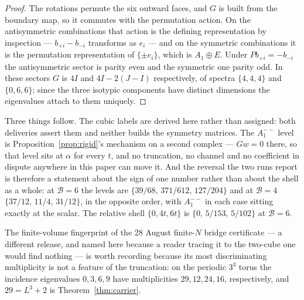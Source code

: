 \documentclass[11pt]{article}
\theoremstyle{plain}
\theoremstyle{definition}
\theoremstyle{remark}
\newcommand{\chk}[1]{}
\begin{document}
\begin{proof}
The rotations permute the six outward faces, and $G$ is built from the boundary
map, so it commutes with the permutation action. On the antisymmetric
combinations that action is the defining representation by inspection --- $b_{+i}-b_{-i}$
transforms as $e_i$ --- and on the symmetric combinations it is the
permutation representation of $\{\pm e_i\}$, which is $A_1\oplus E$. Under
$Pb_{+i}=-b_{-i}$ the antisymmetric sector is parity even and the symmetric one
parity odd. In these sectors $G$ is $4I$ and $4I-2(J-I)$ respectively, of
spectra $\{4,4,4\}$ and $\{0,6,6\}$; since the three isotypic components have
distinct dimensions the eigenvalues attach to them uniquely.
\end{proof}
\chk{the one-cube shell is A1 + T1 + E, and its flat level is the S\^{}2 fundamental class}

Three things follow. The cubic labels are derived here rather than assigned:
both deliveries assert them and neither builds the symmetry matrices. The
$A_1^{--}$ level is Proposition~\ref{prop:rigid}'s mechanism on a second
complex --- $Gw=0$ there, so that level sits at $\alpha$ for every $t$, and no truncation, no
channel and no coefficient in dispute anywhere in this paper can move it. And
the reversal the two runs report is therefore a statement about the sign of one
number rather than about the shell as a whole: at $\mathcal B=6$ the levels are
$\{39/68,\,371/612,\,127/204\}$ and at $\mathcal B=4$ $\{37/12,\,11/4,\,31/12\}$, in
the opposite order, with $A_1^{--}$ in each case sitting exactly at the scalar.
The relative shell $\{0,4t,6t\}$ is $\{0,\,5/153,\,5/102\}$ at $\mathcal B=6$.

The finite-volume fingerprint of the 28 August finite-$N$ bridge certificate
--- a different release, and named here because a reader tracing it to the
two-cube one would find nothing --- is worth recording
because its most discriminating multiplicity is not a feature of the
truncation: on the periodic $3^3$ torus the incidence eigenvalues $0,3,6,9$
have multiplicities $29,12,24,16$, respectively, and $29=L^3+2$ is
Theorem~\ref{thm:carrier}.
\chk{the certificate's finite-volume fingerprints, and 29 = L\^{}3 + 2 is the Lean cycle count}
\end{document}
